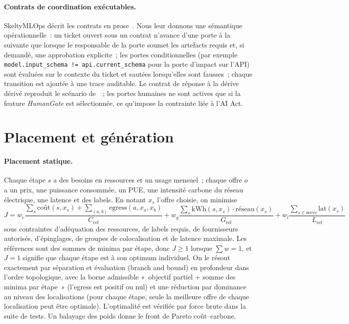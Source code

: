 \documentclass[10pt,a4paper]{article}
\begin{document}
\paragraph{Contrats de coordination exécutables.} SkeltyMLOps décrit les contrats en
prose~\cite{daoud2026}. Nous leur donnons une sémantique opérationnelle~: un ticket
ouvert sous un contrat n'avance d'une porte à la suivante que lorsque le responsable
de la porte soumet les artefacts requis et, si demandé, une approbation explicite~;
les portes conditionnelles (par exemple \texttt{model.input\_schema !=
api.current\_schema} pour la porte d'impact sur l'API) sont évaluées sur le contexte
du ticket et sautées lorsqu'elles sont fausses~; chaque transition est ajoutée à une
trace auditable. Le contrat de réponse à la dérive dérivé reproduit le scénario
de~\cite{daoud2026}~; les portes humaines ne sont actives que si la feature
\emph{HumanGate} est sélectionnée, ce qu'impose la contrainte liée à l'AI Act.

\section{Placement et génération}
\paragraph{Placement statique.} Chaque étape \(s\) a des besoins en ressources et un
usage mensuel~; chaque offre \(o\) a un prix, une puissance consommée, un PUE, une
intensité carbone du réseau électrique, une latence et des labels. En notant \(x_s\)
l'offre choisie, on minimise
\[
J = w_c\frac{\sum_s \mathrm{coût}(s,x_s)+\sum_{(a,b)}\mathrm{egress}(a,x_a,x_b)}{C_{\mathrm{ref}}}
  + w_g\frac{\sum_s \mathrm{kWh}(s,x_s)\cdot \mathrm{réseau}(x_s)}{G_{\mathrm{ref}}}
  + w_l\frac{\sum_{s\in\mathrm{serve}}\mathrm{lat}(x_s)}{L_{\mathrm{ref}}}
\]
sous contraintes d'adéquation des ressources, de labels requis, de fournisseurs
autorisés, d'épinglages, de groupes de colocalisation et de latence maximale. Les
références sont des sommes de minima par étape, donc \(J\ge 1\) lorsque
\(\sum w=1\), et \(J=1\) signifie que chaque étape est à son optimum individuel. On le
résout exactement par séparation et évaluation (branch and bound) en profondeur dans
l'ordre topologique, avec la borne admissible «~objectif partiel + somme des minima
par étape~» (l'egress est positif ou nul) et une réduction par dominance au niveau
des localisations (pour chaque étape, seule la meilleure offre de chaque localisation
peut être optimale). L'optimalité est vérifiée par force brute dans la suite de tests.
Un balayage des poids donne le front de Pareto coût--carbone.
\end{document}

